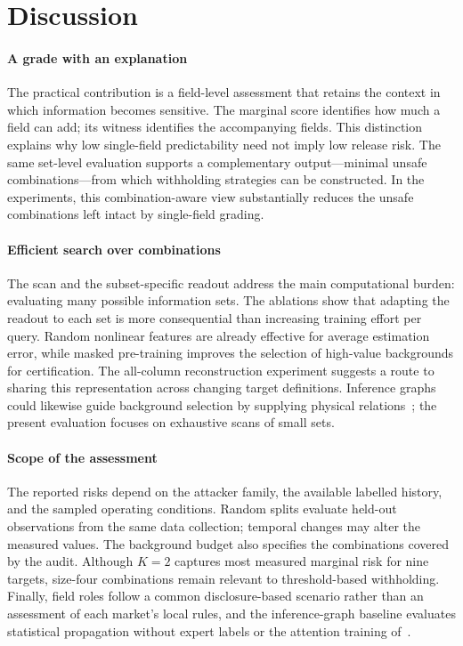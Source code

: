 \section{Discussion}\label{sec:discussion}
\paragraph{A grade with an explanation}
The practical contribution is a field-level assessment that retains the context in which information becomes sensitive. The marginal score identifies how much a field can add; its witness identifies the accompanying fields. This distinction explains why low single-field predictability need not imply low release risk. The same set-level evaluation supports a complementary output---minimal unsafe combinations---from which withholding strategies can be constructed. In the experiments, this combination-aware view substantially reduces the unsafe combinations left intact by single-field grading.

\paragraph{Efficient search over combinations}
The scan and the subset-specific readout address the main computational burden: evaluating many possible information sets. The ablations show that adapting the readout to each set is more consequential than increasing training effort per query. Random nonlinear features are already effective for average estimation error, while masked pre-training improves the selection of high-value backgrounds for certification. The all-column reconstruction experiment suggests a route to sharing this representation across changing target definitions. Inference graphs could likewise guide background selection by supplying physical relations~\cite{hu2026ignn}; the present evaluation focuses on exhaustive scans of small sets.

\paragraph{Scope of the assessment}
The reported risks depend on the attacker family, the available labelled history, and the sampled operating conditions. Random splits evaluate held-out observations from the same data collection; temporal changes may alter the measured values. The background budget also specifies the combinations covered by the audit. Although $K=2$ captures most measured marginal risk for nine targets, size-four combinations remain relevant to threshold-based withholding. Finally, field roles follow a common disclosure-based scenario rather than an assessment of each market's local rules, and the inference-graph baseline evaluates statistical propagation without expert labels or the attention training of~\cite{hu2026ignn}.


